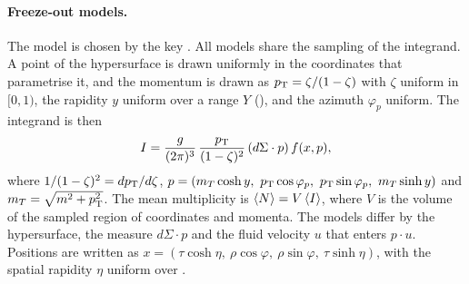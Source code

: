 \paragraph{Freeze-out models.}
The model is chosen by the key . All models share the sampling of the integrand. A point of
the hypersurface is drawn uniformly in the coordinates that parametrise it, and the momentum is drawn as
$p_{\mathrm{T}} = \zeta/(1-\zeta)$ with $\zeta$ uniform in $[0,1)$, the rapidity $y$ uniform over a range $Y$
(), and the azimuth $\varphi_p$ uniform. The integrand is then
\begin{equation}
  I = \frac{g}{(2\pi)^3}\,\frac{p_{\mathrm{T}}}{(1-\zeta)^2}\,(d\Sigma\cdot p)\,f(x,p),
  \label{eq:t3-integrand}
\end{equation}
where $1/(1-\zeta)^2 = dp_{\mathrm{T}}/d\zeta$, $p = (m_T\cosh y,\ \pT\cos\varphi_p,\ \pT\sin\varphi_p,\ m_T\sinh y)$ and $m_T = \sqrt{m^2+p_{\mathrm{T}}^2}$. The mean
multiplicity is $\left\langle N \right\rangle = V\left\langle I \right\rangle$, where $V$ is the volume of the sampled region of coordinates and momenta. The
models differ by the hypersurface, the measure $d\Sigma\cdot p$ and the fluid velocity $u$ that enters $p\cdot u$.
Positions are written as $x = (\tau\cosh\eta,\ \rho\cos\varphi,\ \rho\sin\varphi,\ \tau\sinh\eta)$, with the
spatial rapidity $\eta$ uniform over .
